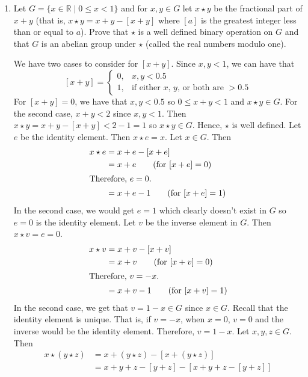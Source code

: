 \begin{enumerate}
\item
  Let \(G = \{x\in\mathbb{R}\mid 0\leq x < 1\}\) and for \(x, y\in G\) let
  \(x\star y\) be the fractional part of \(x + y\) (that is,
  \(x\star y = x + y - [x + y]\) where \([a]\) is the greatest integer less
  than or equal to \(a\)).
  Prove that \(\star\) is a well defined binary operation on \(G\) and that
  \(G\) is an abelian group under \(\star\) (called the real numbers modulo
  one).
  \par\smallskip
  We have two cases to consider for \([x + y]\).
  Since \(x, y < 1\), we can have that
  \[
  [x + y] =
  \begin{cases}
    0, & x, y < 0.5\\
    1, & \text{if either \(x\), \(y\), or both are } > 0.5 
  \end{cases}
  \]
  For \([x + y] = 0\), we have that \(x, y < 0.5\) so \(0\leq x + y < 1\) and
  \(x\star y\in G\).
  For the second case, \(x + y < 2\) since \(x, y < 1\).
  Then \(x\star y = x + y - [x + y] < 2 - 1 = 1\) so \(x\star y\in G\).
  Hence, \(\star\) is well defined.
  Let \(e\) be the identity element.
  Then \(x\star e = x\).
  Let \(x\in G\).
  Then
  \begin{align*}
    x\star e & = x + e - [x + e]\\
             & = x + e\tag{for \([x + e] = 0\)}\\
    \intertext{Therefore, \(e = 0\).}
             & = x + e - 1\tag{for \([x + e] = 1\)}
  \end{align*}
  In the second case, we would get \(e = 1\) which clearly doesn't exist in
  \(G\) so \(e = 0\) is the identity element.
  Let \(v\) be the inverse element in \(G\).
  Then \(x\star v = e = 0\).
  \begin{align*}
    x\star v & = x + v - [x + v]\\
             & = x + v\tag{for \([x + v] = 0\)}\\
    \intertext{Therefore, \(v = -x\).}
             & = x + v - 1\tag{for \([x + v] = 1\)}
  \end{align*}
  In the second case, we get that \(v = 1 - x\in G\) since \(x\in G\).
  Recall that the identity element is unique.
  That is, if \(v = -x\), when \(x = 0\), \(v = 0\) and the inverse would be
  the identity element.
  Therefore, \(v = 1 - x\).
  Let \(x, y, z\in G\).
  Then
  \begin{align*}
    x\star (y\star z) & = x + (y\star z) - [x + (y\star z)]\\
                      & = x + y + z - [y + z] - [x + y + z - [y + z]]\\

\end{align*}
\end{enumerate}
